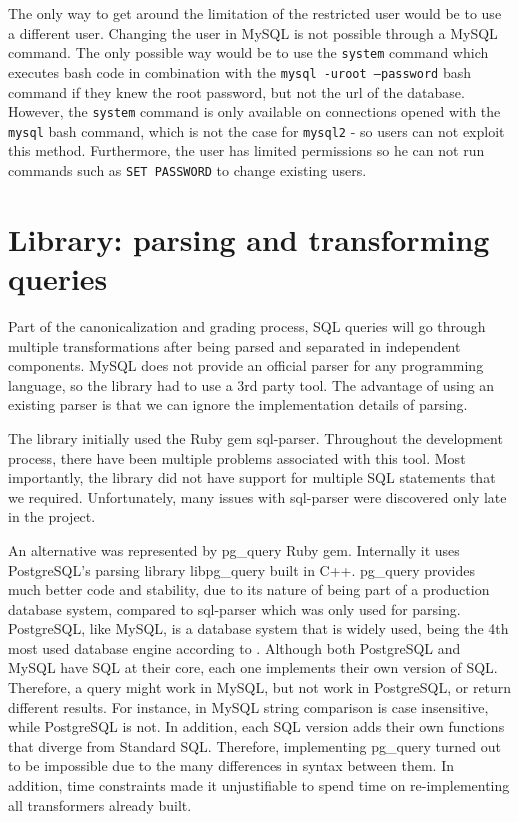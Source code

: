 The only way to get around the limitation of the restricted user would be to use a different user. Changing the user in MySQL is not possible through a MySQL command. The only possible way would be to use the \texttt{system} command which executes bash code in combination with the \texttt{mysql -uroot --password} bash command if they knew the root password, but not the url of the database. However, the \texttt{system} command is only available on connections opened with the \texttt{mysql} bash command, which is not the case for \texttt{mysql2} - so users can not exploit this method. Furthermore, the user has limited permissions so he can not run commands such as \texttt{SET PASSWORD} to change existing users.

\section{Library: parsing and transforming queries}

Part of the canonicalization and grading process, SQL queries will go through multiple transformations after being parsed and separated in independent components. MySQL does not provide an official parser for any programming language, so the library had to use a 3rd party tool. The advantage of using an existing parser is that we can ignore the implementation details of parsing.

The library initially used the Ruby gem sql-parser. Throughout the development process, there have been multiple problems associated with this tool. Most importantly, the library did not have support for multiple SQL statements that we required. Unfortunately, many issues with sql-parser were discovered only late in the project.

An alternative was represented by pg\_query Ruby gem. Internally it uses PostgreSQL's parsing library libpg\_query built in C++. pg\_query provides much better code and stability, due to its nature of being part of a production database system, compared to sql-parser which was only used for parsing. PostgreSQL, like MySQL, is a database system that is widely used, being the 4th most used database engine according to \cite{db_engine:statistics}. Although both PostgreSQL and MySQL have SQL at their core, each one implements their own version of SQL. Therefore, a query might work in MySQL, but not work in PostgreSQL, or return different results. For instance, in MySQL string comparison is case insensitive, while PostgreSQL is not. In addition, each SQL version adds their own functions that diverge from Standard SQL. Therefore, implementing pg\_query turned out to be impossible due to the many differences in syntax between them. In addition, time constraints made it unjustifiable to spend time on re-implementing all transformers already built.

